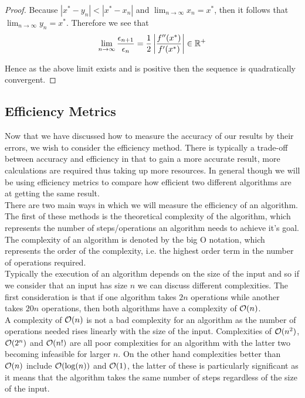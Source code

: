 \begin{Uniform Convergence Thm}
\begin{proof}
Because \(|x^\ast - y_n| < |x^\ast - x_n|\) and \(\lim_{n\to\infty}x_n = x^\ast\), then it follows that \(\lim_{n\to\infty}y_n = x^\ast\). Therefore we see that
\[\lim_{n\to\infty}\frac{\epsilon_{n+1}}{\epsilon_n} = \frac{1}{2}\left|\frac{f''(x^\ast)}{f'(x^\ast)}\right| \in \mathbb{R}^+\]

Hence as the above limit exists and is positive then the sequence is quadratically convergent.
\end{proof}

\subsection{Efficiency Metrics}
\label{SUB_"Efficiency Metrics"}

Now that we have discussed how to measure the accuracy of our results by their errors, we wish to consider the efficiency method. There is typically a trade-off between accuracy and efficiency in that to gain a more accurate result, more calculations are required thus taking up more resources. In general though we will be using efficiency metrics to compare how efficient two different algorithms are at getting the same result.\\

There are two main ways in which we will measure the efficiency of an algorithm. The first of these methods is the theoretical complexity of the algorithm, which represents the number of steps/operations an algorithm needs to achieve it's goal. The complexity of an algorithm is denoted by the big O notation, which represents the order of the complexity, i.e. the highest order term in the number of operations required.\\

Typically the execution of an algorithm depends on the size of the input and so if we consider that an input has size \(n\) we can discuss different complexities. The first consideration is that if one algorithm takes \(2n\) operations while another takes \(20n\) operations, then both algorithms have a complexity of \(\mathcal{O}(n)\). \\

A complexity of \(\mathcal{O}(n)\) is not a bad complexity for an algorithm as the number of operations needed rises linearly with the size of the input. Complexities of \(\mathcal{O}(n^2)\), \(\mathcal{O}(2^n)\) and \(\mathcal{O}(n!)\) are all poor complexities for an algorithm with the latter two becoming infeasible for larger \(n\). On the other hand complexities better than \(\mathcal{O}(n)\) include \(\mathcal{O}(\log(n))\) and \(\mathcal{O}(1)\), the latter of these is particularly significant as it means that the algorithm takes the same number of steps regardless of the size of the input.\\


\end{Uniform Convergence Thm}
